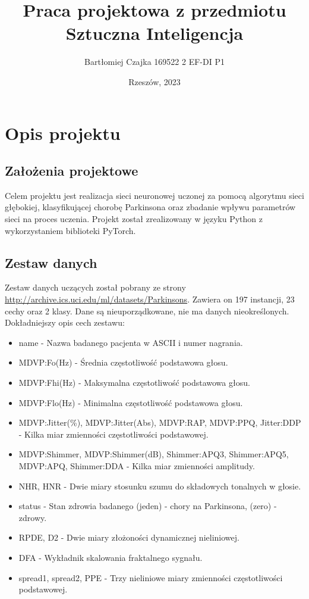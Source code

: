 \documentclass{article}
\title{\textbf{Praca projektowa z przedmiotu Sztuczna Inteligencja}}
\author{Bartłomiej Czajka 169522 2 EF-DI P1}
\date{Rzeszów, 2023}
\begin{document}
\maketitle
\pagebreak


\tableofcontents{}
\newpage
\section{Opis projektu}
\subsection{Założenia projektowe}
Celem projektu jest realizacja sieci neuronowej uczonej za pomocą algorytmu sieci głębokiej, klasyfikującej chorobę Parkinsona oraz zbadanie wpływu parametrów sieci na proces uczenia.
Projekt został zrealizowany w języku Python z wykorzystaniem biblioteki PyTorch.
\subsection{Zestaw danych}
Zestaw danych uczących został pobrany ze strony \href{http://archive.ics.uci.edu/ml/datasets/Parkinsons}{http://archive.ics.uci.edu/ml/datasets/Parkinsons}.
Zawiera on 197 instancji, 23 cechy oraz 2 klasy. Dane są nieuporządkowane, nie ma danych nieokreślonych.
Dokładniejszy opis cech zestawu:
\begin{itemize}
    \item name - Nazwa badanego pacjenta w ASCII i numer nagrania.
    \item MDVP:Fo(Hz) - Średnia częstotliwość podstawowa głosu.
    \item MDVP:Fhi(Hz) - Maksymalna częstotliwość podstawowa głosu.
    \item MDVP:Flo(Hz) - Minimalna częstotliwość podstawowa głosu.
    \item MDVP:Jitter(\%), MDVP:Jitter(Abs), MDVP:RAP, MDVP:PPQ, Jitter:DDP - Kilka miar zmienności częstotliwości podstawowej.
    \item MDVP:Shimmer, MDVP:Shimmer(dB), Shimmer:APQ3, Shimmer:APQ5, MDVP:APQ, Shimmer:DDA - Kilka miar zmienności amplitudy.
    \item NHR, HNR - Dwie miary stosunku szumu do składowych tonalnych w głosie.
    \item status - Stan zdrowia badanego (jeden) - chory na Parkinsona, (zero) - zdrowy.
    \item RPDE, D2 - Dwie miary złożoności dynamicznej nieliniowej.
    \item DFA - Wykładnik skalowania fraktalnego sygnału.
    \item spread1, spread2, PPE - Trzy nieliniowe miary zmienności częstotliwości podstawowej.
\end{itemize}
\end{document}
